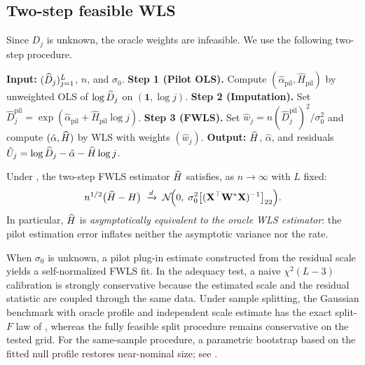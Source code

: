 \subsection{Two-step feasible WLS}

Since $D_j$ is unknown, the oracle weights are infeasible. We use the
following two-step procedure.

\begin{algorithm}[H]
\caption{Two-Step FWLS Estimator}\label{alg:fwls}
\begin{algorithmic}[1]
\State \textbf{Input:} $(\widehat{D}_j)_{j=1}^L$, $n$, and $\sigma_0$.
\State \textbf{Step 1 (Pilot OLS).} Compute $(\hat\alpha_{\mathrm{pil}}, \hat H_{\mathrm{pil}})$ by unweighted OLS of $\log \widehat{D}_j$ on $(\mathbf{1}, \log j)$.
\State \textbf{Step 2 (Imputation).} Set $\hat D_j^{\mathrm{pil}} = \exp(\hat\alpha_{\mathrm{pil}} + \hat H_{\mathrm{pil}} \log j)$.
\State \textbf{Step 3 (FWLS).} Set $\hat w_j = n (\hat D_j^{\mathrm{pil}})^2 / \sigma_0^2$ and compute $(\hat\alpha, \widehat{H})$ by WLS with weights $(\hat w_j)$.
\State \textbf{Output:} $\widehat{H}$, $\hat\alpha$, and residuals $\hat U_j = \log \widehat{D}_j - \hat\alpha - \widehat{H} \log j$.
\end{algorithmic}
\end{algorithm}

\begin{theorem}
\label{thm:clt-fwls}
Under , the two-step FWLS estimator
$\widehat{H}$ satisfies, as $n \to \infty$ with $L$ fixed:
\begin{equation}
    n^{1/2}\bigl(\widehat{H} - H\bigr) \;\xrightarrow{d}\;
    \mathcal{N}\!\Bigl(0,\; \sigma_0^2
    \bigl[(\mathbf{X}^\top \mathbf{W}^* \mathbf{X})^{-1}\bigr]_{22}\Bigr).
    \label{eq:fwls-clt}
\end{equation}
In particular, $\widehat{H}$ is \emph{asymptotically equivalent to the oracle
WLS estimator}: the pilot estimation error inflates neither the asymptotic
variance nor the rate.
\end{theorem}

\begin{remark}
    When $\sigma_0$ is unknown, a pilot plug-in estimate constructed from the
    residual scale yields a self-normalized FWLS fit. In the adequacy test,
    a naive $\chi^2(L-3)$ calibration is strongly conservative because the
    estimated scale and the residual statistic are coupled through the same
    data. Under sample splitting, the Gaussian benchmark with oracle profile and
    independent scale estimate has the exact split-$F$ law of
    , whereas the fully feasible split procedure
    remains conservative on the tested grid. For the same-sample procedure, a
    parametric bootstrap based on the fitted null profile restores near-nominal
    size; see .
\end{remark}

